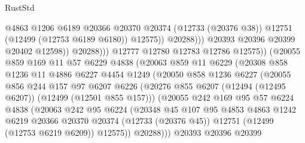 \begin{lexlean}{RustStd}
\begin{coremodule}
{\begin{coremodule}
{{{{{{{{{{{{{{{{{{{{{{{{{{{{{{{{{{{{{{{{{{{{{{{{{{{{{{{{{{{{{{{{{{{{{{{{{{{{{{{{                                    @4863
                                    @1206
                                    @6189
                                    @20366
                                    @20370
                                    @20374
                                    (@12733 (@20376 @38))
                                    @12751
                                    (@12499 (@12753 @6189 @6180))
                                    @12575))
                                @20288)))
                          @20393
                          @20396
                          @20399
                          @20402
                          @12598))
                      @20288)))
                @12777
                @12780
                @12783
                @12786
                @12575))
            (@20055
              @859
              @169
              @11
              @57
              @6229
              @4838
              (@20063
                @859
                @11
                @6229
                (@20308
                  @858
                  @1236
                  @11
                  @4886
                  @6227
                  @4454
                  @1249
                  (@20050
                    @858
                    @1236
                    @6227
                    (@20055
                      @856
                      @244
                      @157
                      @97
                      @6207
                      @6226
                      (@20276 @855 @6207 (@12494 (@12495 @6207)) (@12499 (@12501 @855 @157)))
                      (@20055
                        @242
                        @169
                        @95
                        @57
                        @6224
                        @4838
                        (@20063
                          @242
                          @95
                          @6224
                          (@20348
                            @45
                            @107
                            @95
                            @4853
                            @4863
                            @1242
                            @6219
                            @20366
                            @20370
                            @20374
                            (@12733 (@20376 @45))
                            @12751
                            (@12499 (@12753 @6219 @6209))
                            @12575))
                        @20288)))
                  @20393
                  @20396
                  @20399
}}}}}}}}}}}}}}}}}}}}}}}}}}}}}}}}}}}}}}}}}}}}}}}}}}}}}}}}}}}}}}}}}}}}}}}}}}}}}}}}
\end{coremodule}}
\end{coremodule}
\end{lexlean}
